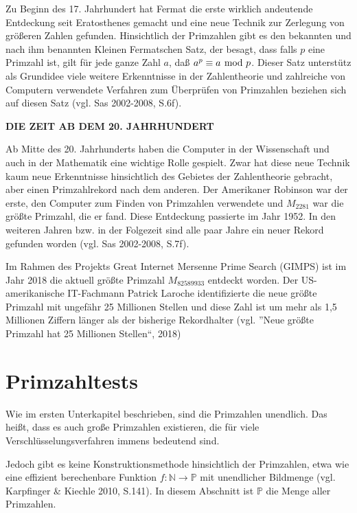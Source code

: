 Zu Beginn des 17. Jahrhundert hat Fermat die erste
wirklich andeutende Entdeckung seit Eratosthenes gemacht
und eine neue Technik zur Zerlegung von größeren Zahlen
gefunden. Hinsichtlich der Primzahlen gibt es den bekannten
und nach ihm benannten Kleinen Fermatschen Satz, der besagt,
dass falls $p$ eine Primzahl ist, gilt für jede ganze Zahl
$a$, daß $a^p \equiv a \mskip-5mu\mod p$. Dieser Satz unterstütz als
Grundidee viele weitere Erkenntnisse in der Zahlentheorie
und zahlreiche von Computern verwendete Verfahren zum
Überprüfen von Primzahlen beziehen sich auf diesen Satz
(vgl. Sas 2002-2008, S.6f).
\vspace*{.4cm}

\textbf{DIE ZEIT AB DEM 20. JAHRHUNDERT}

Ab Mitte des 20. Jahrhunderts haben die Computer in der
Wissenschaft und auch in der Mathematik eine wichtige
Rolle gespielt. Zwar hat diese neue Technik kaum neue
Erkenntnisse hinsichtlich des Gebietes der Zahlentheorie
gebracht, aber einen Primzahlrekord nach dem anderen.
Der Amerikaner Robinson war der erste, den Computer zum
Finden von Primzahlen verwendete und $M_{2281}$ war die
größte Primzahl, die er fand. Diese Entdeckung passierte
im Jahr 1952. In den weiteren Jahren bzw. in der Folgezeit
sind alle paar Jahre ein neuer Rekord gefunden worden
(vgl. Sas 2002-2008, S.7f).

Im Rahmen des Projekts Great Internet Mersenne Prime Search
(GIMPS) ist im Jahr 2018 die aktuell größte Primzahl
$M_{82589933}$ entdeckt worden. Der US-amerikanische
IT-Fachmann Patrick Laroche identifizierte die neue größte
Primzahl mit ungefähr 25 Millionen Stellen und diese Zahl
ist um mehr als 1,5 Millionen Ziffern länger als der
bisherige Rekordhalter
(vgl. ''Neue größte Primzahl hat 25 Millionen Stellen``, 2018)

\newpage

\section{Primzahltests}

Wie im ersten Unterkapitel beschrieben, sind die Primzahlen
unendlich. Das heißt, dass es auch große Primzahlen
existieren, die für viele Verschlüsselungsverfahren immens
bedeutend sind.

Jedoch gibt es keine Konstruktionsmethode hinsichtlich der
Primzahlen, etwa wie eine effizient berechenbare Funktion
$f : \mathbb{N} \to \mathbb{P}$ mit unendlicher Bildmenge
(vgl. Karpfinger \& Kiechle 2010, S.141).
In diesem Abschnitt ist $\mathbb{P}$ die Menge aller
Primzahlen.

